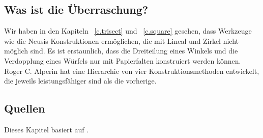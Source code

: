 \subsection*{Was ist die Überraschung?}

Wir haben in den Kapiteln ~\ref{c.trisect} und ~\ref{c.square} gesehen, dass Werkzeuge wie die Neusis Konstruktionen ermöglichen, die mit Lineal und Zirkel nicht möglich sind. Es ist erstaunlich, dass die Dreiteilung eines Winkels und die Verdopplung eines Würfels nur mit Papierfalten konstruiert werden können. Roger C. Alperin hat eine Hierarchie von vier Konstruktionsmethoden entwickelt, die jeweils leistungsfähiger sind als die vorherige.

\subsection*{Quellen}

Dieses Kapitel basiert auf \cite{alperin,lang,martin,newton}.
